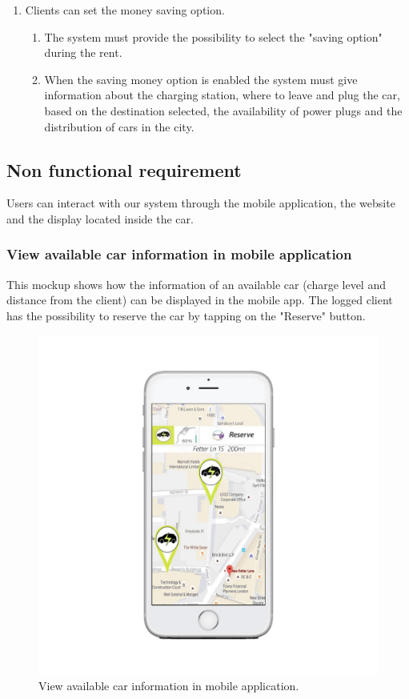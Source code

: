 \begin{enumerate}
\item Clients can set the money saving option.
\begin{enumerate}
\item The system must provide the possibility to select the "saving option" during the rent.
\item When the saving money option is enabled the system must give information about the charging station, where to leave and plug the car, based on the destination selected, the availability of power plugs and the distribution of cars in the city.
\end{enumerate}
\end{enumerate}

\newpage
\subsection{Non functional requirement}
Users can interact with our system through the mobile application, the website and the display located inside the car.

\subsubsection{View available car information in mobile application} This mockup shows how the information of an available car (charge level and distance from the client) can be displayed in the mobile app. The logged client has the possibility to reserve the car by tapping on the "Reserve" button.
\begin{figure}[hp]
\centering
\includegraphics[width=470 pt]{resources/editato.jpg}
\caption{\label{fig:editato}View available car information in mobile application.}
\end{figure}

